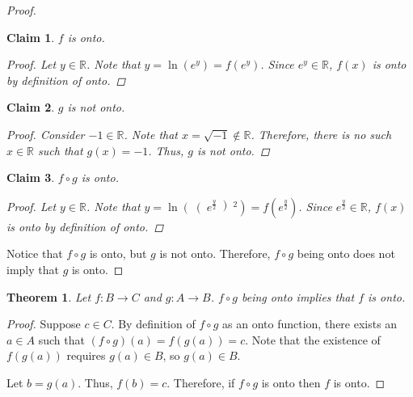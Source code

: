\documentclass{article}
\newtheorem{theorem}{Theorem}
\newtheorem{claim}{Claim}
\begin{document}
\begin{outline}[enumerate]
\begin{proof}
            \begin{claim}
                $f$ is onto.
                \begin{adjustwidth}{0.5cm}{0.5cm}
                    \begin{proof}
                        Let $y \in \mathbb{R}$. 
                        Note that $y = \ln \left(e^y\right) = f(e^y)$. 
                        Since $e^y \in \mathbb{R}$, $f(x)$ is onto by definition of onto.  
                    \end{proof}
                \end{adjustwidth}
            \end{claim}

            \begin{claim}
                $g$ is not onto.
                \begin{adjustwidth}{0.5cm}{0.5cm}
                    \begin{proof}
                        Consider $-1 \in \mathbb{R}$. 
                        Note that $x = \sqrt{-1} \notin \mathbb{R}$. 
                        Therefore, there is no such $x \in \mathbb{R}$ such that $g(x) = -1$. 
                        Thus, $g$ is not onto.
                    \end{proof}
                \end{adjustwidth}
            \end{claim}

            \begin{claim}
                $f \circ g$ is onto.
                \begin{adjustwidth}{0.5cm}{0.5cm}
                    \begin{proof}
                        Let $y \in \mathbb{R}$. 
                        Note that $y = \ln \left(\right(e^\frac{y}{2}\left)^2\right) 
                        = f \left( e^\frac{y}{2}\right)$.
                        Since $e^\frac{y}{2} \in \mathbb{R}$, $f(x)$ is onto by definition of onto.  
                    \end{proof}
                \end{adjustwidth}
            \end{claim}

            Notice that $f \circ g$ is onto, but $g$ is not onto. Therefore,  $f \circ g$ being onto does not imply that $g$ is onto.
        \end{proof}
        \2 \begin{theorem}
            Let $f: B \rightarrow C$ and $g: A \rightarrow B$. $f \circ g$ being onto implies that $f$ is onto.
        \end{theorem}
        \begin{proof}
            Suppose $c \in C$. By definition of $f \circ g$ as an onto function, there exists an $a \in A$ such that $(f \circ g)(a) = f(g(a)) = c$. Note that the existence of $f(g(a))$ requires $g(a) \in B$, so $g(a) \in B$.
            
            Let $b = g(a)$. Thus, $f(b) = c$. Therefore, if $f \circ g$ is onto then $f$ is onto.
        \end{proof}
\end{outline} 
\end{document}
